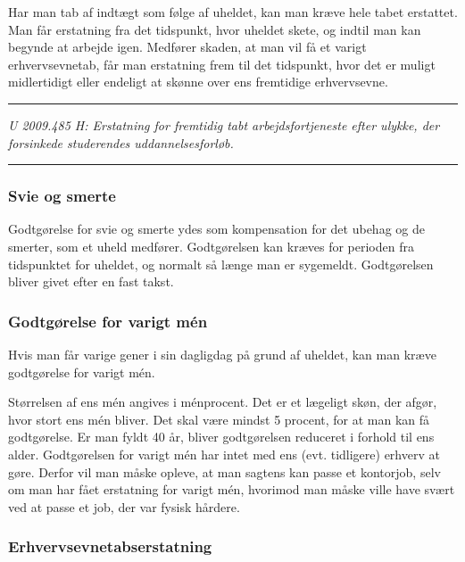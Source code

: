 \documentclass[]{book}
\begin{document}
Har man tab af indtægt som følge af uheldet, kan man kræve hele tabet erstattet. Man får erstatning fra det tidspunkt, hvor uheldet skete, og indtil man kan begynde at arbejde igen. Medfører skaden, at man vil få et varigt erhvervsevnetab, får man erstatning frem til det tidspunkt, hvor det er muligt midlertidigt eller endeligt at skønne over ens fremtidige erhvervsevne.

\begin{center}\rule{0.5\linewidth}{\linethickness}\end{center}

\emph{U 2009.485 H: Erstatning for fremtidig tabt arbejdsfortjeneste efter ulykke, der forsinkede studerendes uddannelsesforløb.}

\begin{center}\rule{0.5\linewidth}{\linethickness}\end{center}

\hypertarget{svie-og-smerte}{%
\subsubsection{Svie og smerte}\label{svie-og-smerte}}

Godtgørelse for svie og smerte ydes som kompensation for det ubehag og de smerter, som et uheld medfører. Godtgørelsen kan kræves for perioden fra tidspunktet for uheldet, og normalt så længe man er sygemeldt. Godtgørelsen bliver givet efter en fast takst.

\hypertarget{godtgrelse-for-varigt-men}{%
\subsubsection{Godtgørelse for varigt mén}\label{godtgrelse-for-varigt-men}}

Hvis man får varige gener i sin dagligdag på grund af uheldet, kan man kræve godtgørelse for varigt mén.

Størrelsen af ens mén angives i ménprocent. Det er et lægeligt skøn, der afgør, hvor stort ens mén bliver. Det skal være mindst 5 procent, for at man kan få godtgørelse. Er man fyldt 40 år, bliver godtgørelsen reduceret i forhold til ens alder. Godtgørelsen for varigt mén har intet med ens (evt. tidligere) erhverv at gøre. Derfor vil man måske opleve, at man sagtens kan passe et kontorjob, selv om man har fået erstatning for varigt mén, hvorimod man måske ville have svært ved at passe et job, der var fysisk hårdere.

\hypertarget{erhvervsevnetabserstatning}{%
\subsubsection{Erhvervsevnetabserstatning}\label{erhvervsevnetabserstatning}}
\end{document}
